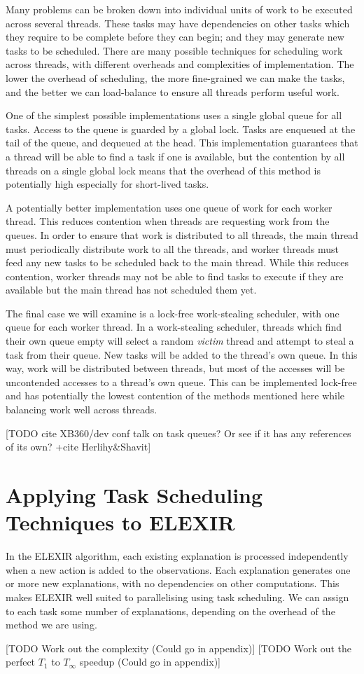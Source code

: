 Many problems can be broken down into individual units of work to be executed across several threads. These tasks may have dependencies on other tasks which they require to be complete before they can begin; and they may generate new tasks to be scheduled. There are many possible techniques for scheduling work across threads, with different overheads and complexities of implementation. The lower the overhead of scheduling, the more fine-grained we can make the tasks, and the better we can load-balance to ensure all threads perform useful work.

One of the simplest possible implementations uses a single global queue for all tasks. Access to the queue is guarded by a global lock. Tasks are enqueued at the tail of the queue, and dequeued at the head. This implementation guarantees that a thread will be able to find a task if one is available, but the contention by all threads on a single global lock means that the overhead of this method is potentially high especially for short-lived tasks.

A potentially better implementation uses one queue of work for each worker thread. This reduces contention when threads are requesting work from the queues. In order to ensure that work is distributed to all threads, the main thread must periodically distribute work to all the threads, and worker threads must feed any new tasks to be scheduled back to the main thread. While this reduces contention, worker threads may not be able to find tasks to execute if they are available but the main thread has not scheduled them yet.

The final case we will examine is a lock-free work-stealing scheduler, with one queue for each worker thread. In a work-stealing scheduler, threads which find their own queue empty will select a random \emph{victim} thread and attempt to steal a task from their queue. New tasks will be added to the thread's own queue. In this way, work will be distributed between threads, but most of the accesses will be uncontended accesses to a thread's own queue. This can be implemented lock-free and has potentially the lowest contention of the methods mentioned here while balancing work well across threads.

[TODO cite XB360/dev conf talk on task queues? Or see if it has any references of its own? +cite Herlihy\&Shavit]

\section{Applying Task Scheduling Techniques to ELEXIR}

In the ELEXIR algorithm, each existing explanation is processed independently when a new action is added to the observations. Each explanation generates one or more new explanations, with no dependencies on other computations. This makes ELEXIR well suited to parallelising using task scheduling. We can assign to each task some number of explanations, depending on the overhead of the method we are using.

[TODO Work out the complexity (Could go in appendix)]
[TODO Work out the perfect $T_1$ to $T_\infty$ speedup (Could go in appendix)]
